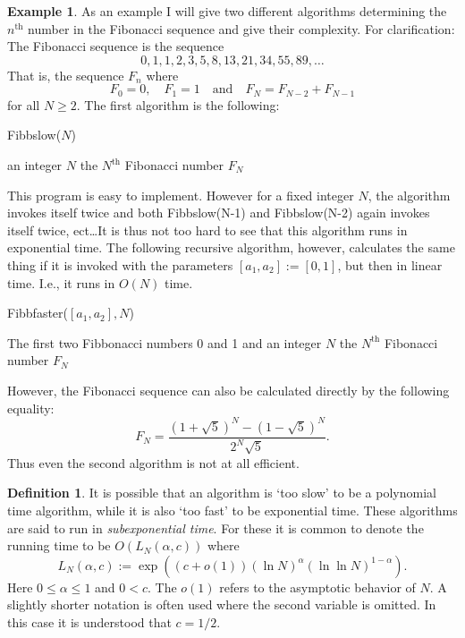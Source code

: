 \documentclass{article}
\numberwithin{equation}{section}
\theoremstyle{definition}
\newtheorem{definition}[theorem]{Definition}
\newtheorem{example}[theorem]{Example}
\begin{document}
\begin{example} 
As an example I will give two different algorithms determining the $n^\text{th}$ number in the Fibonacci sequence and give their complexity. For clarification: The Fibonacci sequence is the sequence $$0,1,1,2,3,5,8,13,21,34,55,89,\ldots$$
That is, the sequence $F_n$ where $$F_0=0, \quad F_1=1 \quad \text{and} \quad F_N=F_{N-2}+F_{N-1}$$ for all $N \geq 2$. The first algorithm is the following:

\begin{algorithm}
\caption{Fibbslow($N$)}
\begin{algorithmic}[1]
  \normalsize
  \REQUIRE an integer $N$
  \ENSURE the $N^\text{th}$ Fibonacci number $F_N$
  \ENDIF
  \ENDIF
\end{algorithmic}
\end{algorithm}

This program is easy to implement. However for a fixed integer $N$, the algorithm invokes itself twice and both Fibbslow(N-1) and Fibbslow(N-2) again invokes itself twice, ect\ldots It is thus not too hard to see that this algorithm runs in exponential time. The following recursive algorithm, however, calculates the same thing if it is invoked with the parameters $[a_1,a_2]:=[0,1]$, but then in linear time. I.e., it runs in $O(N)$ time.

\begin{algorithm}
\caption{Fibbfaster($[a_1,a_2],N$)}
\begin{algorithmic}[1]
  \normalsize
  \REQUIRE The first two Fibbonacci numbers 0 and 1 and an integer $N$
  \ENSURE the $N^\text{th}$ Fibonacci number $F_N$
  \ELSE
  \ENDIF
\end{algorithmic}
\end{algorithm}
However, the Fibonacci sequence can also be calculated directly by the following equality: $$F_N=\frac{(1+\sqrt{5})^N-(1-\sqrt{5})^N}{2^N\sqrt{5}}.$$ Thus even the second algorithm is not at all efficient.
\end{example}

\begin{definition}\label{subexp}
It is possible that an algorithm is `too slow' to be a polynomial time algorithm, while it is also `too fast' to be exponential time. These algorithms are said to run in \emph{subexponential time}. For these it is common to denote the running time to be $O(L_N(\alpha,c))$ where $$L_N(\alpha,c):=\exp((c+o(1))(\ln N)^\alpha(\ln \ln N)^{1-\alpha}).$$ Here $0 \leq \alpha \leq 1$ and $0<c$. The $o(1)$ refers to the asymptotic behavior of $N$. A slightly shorter notation is often used where the second variable is omitted. In this case it is understood that $c=1/2$.
\end{definition}
\end{document}
